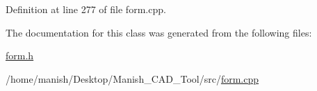 Definition at line 277 of file form.\+cpp.



The documentation for this class was generated from the following files\+:\begin{DoxyCompactItemize}
\item 
\hyperlink{form_8h}{form.\+h}\item 
/home/manish/\+Desktop/\+Manish\+\_\+\+C\+A\+D\+\_\+\+Tool/src/\hyperlink{form_8cpp}{form.\+cpp}\end{DoxyCompactItemize}

